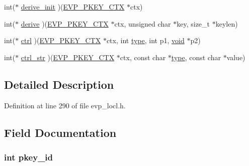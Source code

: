 \begin{DoxyCompactItemize}
\item 
int($\ast$ \hyperlink{structevp__pkey__method__st_a82c46287482e35cbf13acf8c695c5a12}{derive\+\_\+init} )(\hyperlink{crypto_2ossl__typ_8h_aaadbb75633e4460a52864970a3b875de}{E\+V\+P\+\_\+\+P\+K\+E\+Y\+\_\+\+C\+TX} $\ast$ctx)
\item 
int($\ast$ \hyperlink{structevp__pkey__method__st_a7542398d84afdc686c9ddfc222f16810}{derive} )(\hyperlink{crypto_2ossl__typ_8h_aaadbb75633e4460a52864970a3b875de}{E\+V\+P\+\_\+\+P\+K\+E\+Y\+\_\+\+C\+TX} $\ast$ctx, unsigned char $\ast$key, size\+\_\+t $\ast$keylen)
\item 
int($\ast$ \hyperlink{structevp__pkey__method__st_a0f35ba06140f666e4d4a20d50434e4c9}{ctrl} )(\hyperlink{crypto_2ossl__typ_8h_aaadbb75633e4460a52864970a3b875de}{E\+V\+P\+\_\+\+P\+K\+E\+Y\+\_\+\+C\+TX} $\ast$ctx, int \hyperlink{include_2openssl_2x509_8h_ab512b8f495325c7ea0f5a5a5d3f938eb}{type}, int p1, \hyperlink{hw__4758__cca_8h_afad4d591c7931ff6dc5bf69c76c96aa0}{void} $\ast$p2)
\item 
int($\ast$ \hyperlink{structevp__pkey__method__st_af114ec4cdf22ff5e9baa3eb5f0778604}{ctrl\+\_\+str} )(\hyperlink{crypto_2ossl__typ_8h_aaadbb75633e4460a52864970a3b875de}{E\+V\+P\+\_\+\+P\+K\+E\+Y\+\_\+\+C\+TX} $\ast$ctx, const char $\ast$\hyperlink{include_2openssl_2x509_8h_ab512b8f495325c7ea0f5a5a5d3f938eb}{type}, const char $\ast$value)
\end{DoxyCompactItemize}


\subsection{Detailed Description}


Definition at line 290 of file evp\+\_\+locl.\+h.



\subsection{Field Documentation}
\subsubsection[{\texorpdfstring{pkey\+\_\+id}{pkey_id}}]{\setlength{\rightskip}{0pt plus 5cm}int pkey\+\_\+id}\hypertarget{structevp__pkey__method__st_a1021097b3af14d7ae24a3756def116d2}{}\label{structevp__pkey__method__st_a1021097b3af14d7ae24a3756def116d2}



